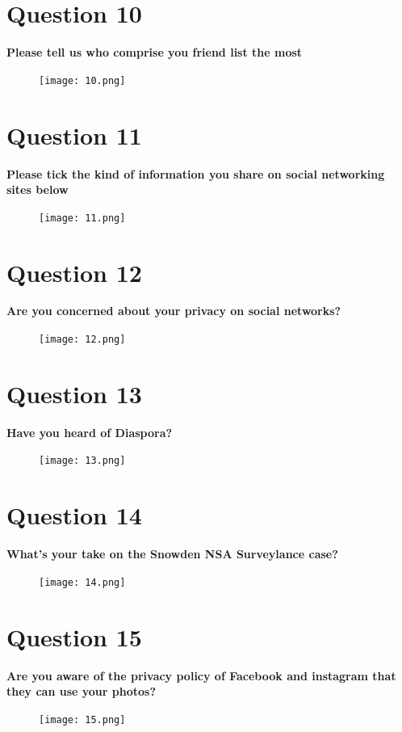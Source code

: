 \documentclass[11pt]{book}
\begin{document}
\newpage
\chapter{Question 10}
\textbf{Please tell us who comprise you friend list the most
}
\begin{figure}[ht!]
	\centering
	\texttt{[image: 10.png]}
	\label{overflow}
\end{figure}

\newpage
\chapter{Question 11}
\textbf{Please tick the kind of information you share on social networking sites below
}
\begin{figure}[ht!]
	\centering
	\texttt{[image: 11.png]}
	\label{overflow}
\end{figure}

\newpage
\chapter{Question 12}
\textbf{Are you concerned about your privacy on social networks?
}
\begin{figure}[ht!]
	\centering
	\texttt{[image: 12.png]}
	\label{overflow}
\end{figure}

\newpage
\chapter{Question 13}
\textbf{Have you heard of Diaspora?
}
\begin{figure}[ht!]
	\centering
	\texttt{[image: 13.png]}
	\label{overflow}
\end{figure}

\newpage
\chapter{Question 14}
\textbf{What's your take on the Snowden NSA Surveylance case?
}
\begin{figure}[ht!]
	\centering
	\texttt{[image: 14.png]}
	\label{overflow}
\end{figure}

\newpage
\chapter{Question 15}
\textbf{Are you aware of the privacy policy of Facebook and instagram that they can use your photos?
}
\begin{figure}[ht!]
	\centering
	\texttt{[image: 15.png]}
	\label{overflow}
\end{figure}
\end{document}
